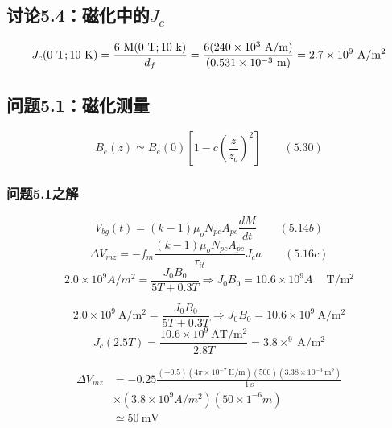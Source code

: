 \subsection{讨论5.4：磁化中的$J_c$}
\begin{equation}%
J_{c}(0\ \mathrm{T};10\ \mathrm{K})=\frac{6\ \mathrm{M}(0\ \mathrm{T};10\ \mathrm{k})}{d_{f}}\\
=\frac{6(240\times10^{3}\ \mathrm{A/m})}{(0.531\times10^{-3}\ \mathrm{m})}\\
=2.7\times10^{9}\ \mathrm{A/m^{2}}
\end{equation}


\subsection{问题5.1：磁化测量}

\begin{equation}%
B_{e}(z)\simeq B_{e}(0)[1-c(\frac{z}{z_{o}})^{2}]\qquad(5.30)
\end{equation}

\subsubsection{问题5.1之解}

\begin{equation}%
V_{bg}(t)=(k-1)\mu_{o}N_{pc}A_{pc}\frac{dM}{dt}\qquad(5.14b)
\end{equation}
\begin{equation}%
\Delta V_{mz}=-f_{m}\frac{(k-1)\mu_{o}N_{pc}A_{pc}}{\tau_{it}}J_{c}a\qquad(5.16c)
\end{equation}
\begin{equation}%
2.0\times10^{9}A/m^{2}=\frac{J_{0}B_{0}}{5T+0.3T}\Rightarrow J_{0}B_{0}=10.6\times10^{9}A\quad\ \mathrm{T/m^{2}}
\end{equation}

\begin{equation}%
2.0\times 10^{9}\ \mathrm{A/m^{2}}=\frac{J_{0}B_{0}}{5T+0.3T}\Rightarrow J_{0}B_{0}=10.6\times10^{9}\ \mathrm{A/m^{2}}
\end{equation}
\begin{equation}%
J_{c}(2.5T)=\frac{10.6\times10^{9}\ \mathrm{AT/m^{2}}}{2.8T}=3.8\times^{9}\ \mathrm{A/m^{2}}
\end{equation}




\begin{align*}%
\Delta V_{mz}&=-0.25\frac{(-0.5)(4\pi\times 10^{-7}\ \mathrm{H/m})(500)(3.38\times 10^{-3}\ \mathrm{m^{2}})}{1\ \mathrm{s}}\\
&\times(3.8\times 10^{9} A/m^{2})(50\times 1^{-6} m)\\
&\simeq 50\ \mathrm{mV}
\end{align*}



